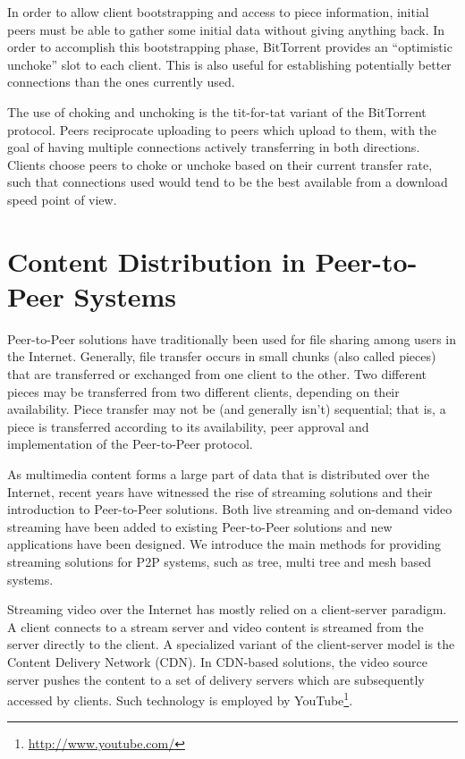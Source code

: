 In order to allow client bootstrapping and access to piece information,
initial peers must be able to gather some initial data without giving anything
back. In order to accomplish this bootstrapping phase, BitTorrent provides an
``optimistic unchoke'' slot to each client. This is also useful for
establishing potentially better connections than the ones currently used.

The use of choking and unchoking is the tit-for-tat variant of the BitTorrent
protocol. Peers reciprocate uploading to peers which upload to them, with the
goal of having multiple connections actively transferring in both directions.
Clients choose peers to choke or unchoke based on their current transfer rate,
such that connections used would tend to be the best available from a download
speed point of view.

\section{Content Distribution in Peer-to-Peer Systems}
\label{sec:p2p-systems:streaming}

Peer-to-Peer solutions have traditionally been used for file sharing among
users in the Internet. Generally, file transfer occurs in small chunks (also
called pieces) that are transferred or exchanged from one client to the other.
Two different pieces may be transferred from two different clients, depending
on their availability. Piece transfer may not be (and generally isn't)
sequential; that is, a piece is transferred according to its availability,
peer approval and implementation of the Peer-to-Peer protocol.

As multimedia content forms a large part of data that is distributed over the
Internet, recent years have witnessed the rise of streaming solutions and
their introduction to Peer-to-Peer solutions. Both live streaming and
on-demand video streaming have been added to existing Peer-to-Peer solutions
and new applications have been designed. We introduce the main methods for
providing streaming solutions for P2P systems, such as tree, multi tree and
mesh based systems.

Streaming video over the Internet has mostly relied on a client-server
paradigm. A client connects to a stream server and video content is streamed
from the server directly to the client. A specialized variant of the
client-server model is the Content Delivery Network (CDN). In CDN-based
solutions, the video source server pushes the content to a set of delivery
servers which are subsequently accessed by clients. Such technology is
employed by YouTube\footnote{\url{http://www.youtube.com/}}.

